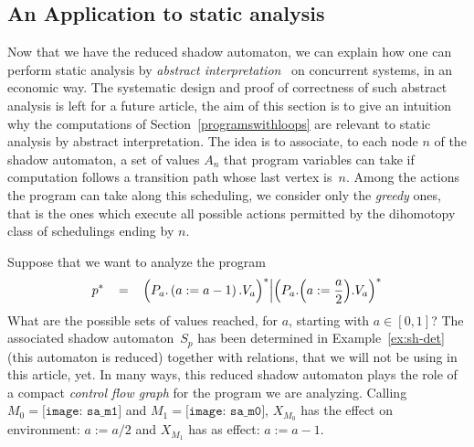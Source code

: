 \documentclass[orivec]{llncs} \usepackage[T1]{fontenc}
\renewcommand{\P}[1]{P_{#1}}
\newcommand{\V}[1]{V_{#1}}
\newcommand{\pa}[1]{\left(#1\right)}
\begin{document}
\subsection{An Application to static analysis}
\label{sec:static-anal}
Now that we have the reduced shadow automaton, we can 
explain how one can perform static analysis by \emph{abstract
  interpretation}~\cite{systematic} on concurrent systems, in an economic
way. The systematic design and proof of correctness of such abstract analysis is
left for a future article, the aim of this section is to give an intuition why
the computations of Section~\ref{programswithloops} are relevant to static
analysis by abstract interpretation. The idea is to associate, to each node $n$
of the shadow automaton, a set of values $A_n$ that program
variables can take if computation follows a transition path
whose last vertex is~$n$. Among the actions the program can take along this
scheduling, we consider only the \emph{greedy} ones, that is the ones which
execute all possible actions permitted by the dihomotopy class of schedulings
ending by $n$.

Suppose that we want to analyze the program
\begin{equation}
  \label{eq:ai-p}
  p^*
  \hspace{2ex}=\hspace{2ex}
  \Big(\P a.\pa{a:=a-1}.\V a\Big)^* \Big|\Big(\P a.\Big(a:=\frac{a}{2}\Big).\V a\Big)^*
\end{equation}
What are the possible sets of values reached, for $a$, starting with $a \in
[0,1]$? The associated shadow automaton~$S_p$ has been determined in
Example~\ref{ex:sh-det} (this automaton is reduced) together with relations,
that we will not be using in this article, yet. In many ways, this reduced
shadow automaton plays the role of a compact \emph{control flow graph} for
the program we are analyzing.
Calling 
$M_0=\texttt{[image: sa\_m1]}$ and
$M_1=\texttt{[image: sa\_m0]}$, $X_{M_0}$ has the effect on environment: $a:=a/2$ and
$X_{M_1}$ has as effect: $a:=a-1$.
\end{document}
